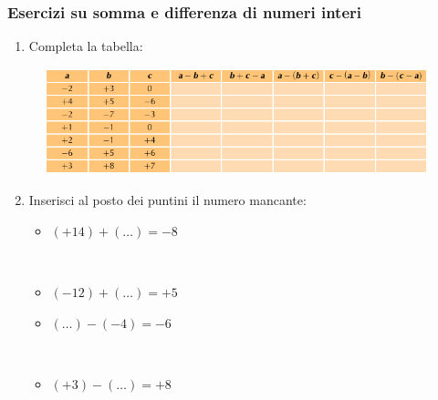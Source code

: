 \documentclass[handout]{beamer}
\theoremstyle{plain}
\begin{document}
\begin{frame}
\frametitle{Esercizi su somma e differenza di numeri interi}
\begin{enumerate}\setcounter{enumi}{0}
  \item Completa la tabella:
\end{enumerate}
\begin{figure}
  \includegraphics[width=\columnwidth]{img/eseinteri.png}
\end{figure}
\begin{enumerate}\setcounter{enumi}{1}
  \item Inserisci al posto dei puntini il numero mancante:
  \begin{multicols}{2}
    \begin{itemize}
      \item $ (+14) + (\ldots) = -8 $
      
      ~
      \item $ (-12) + (\ldots) = +5 $
      \item $ (\ldots) - (-4) = -6 $
      
      ~
      \item $ (+3) - (\ldots) = +8 $
    \end{itemize}
  \end{multicols}
\end{enumerate}
\end{frame}
\end{document}
